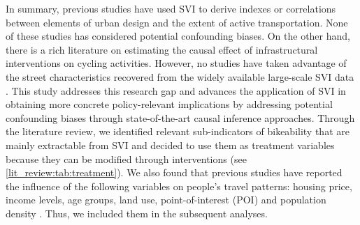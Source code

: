 \documentclass[preprint,12pt, authoryear]{elsarticle}
\begin{document}
In summary, previous studies have used SVI to derive indexes or correlations between elements of urban design and the extent of active transportation. None of these studies has considered potential confounding biases. On the other hand, there is a rich literature on estimating the causal effect of infrastructural interventions on cycling activities. However, no studies have taken advantage of the street characteristics recovered from the widely available large-scale SVI data \citep{molenberg_systematic_2019}. This study addresses this research gap and advances the application of SVI in obtaining more concrete policy-relevant implications by addressing potential confounding biases through state-of-the-art causal inference approaches. 
Through the literature review, we identified relevant sub-indicators of bikeability that are mainly extractable from SVI and decided to use them as treatment variables because they can be modified through interventions (see \autoref{lit_review:tab:treatment}).
We also found that previous studies have reported the influence of the following variables on people's travel patterns: housing price, income levels, age groups, land use, point-of-interest (POI) and population density \citep{anas_discrete_1984, vasudevan_determining_2021, odriscoll_how_2023, zhang_role_2004, king_does_2015, frank_impacts_1994}. 
Thus, we included them in the subsequent analyses.
\end{document}
